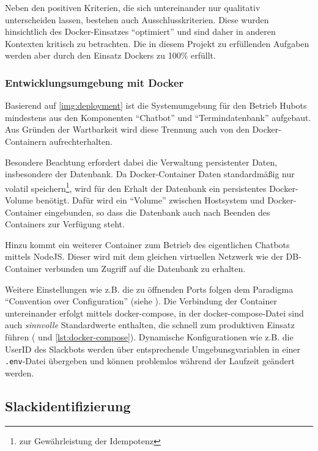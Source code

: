 Neben den positiven Kriterien, die sich untereinander nur qualitativ unterscheiden lassen, bestehen auch Ausschlusskriterien. Diese wurden hinsichtlich des Docker-Einsatzes \enquote{optimiert} und sind daher in anderen Kontexten kritisch zu betrachten. Die in diesem Projekt zu erfüllenden Aufgaben werden aber durch den Einsatz Dockers zu 100\% erfüllt.

\subsubsection{Entwicklungsumgebung mit Docker}

Basierend auf \autoref{img:deployment} ist die Systemumgebung für den Betrieb Hubots mindestens aus den Komponenten \enquote{Chatbot} und \enquote{Termindatenbank} aufgebaut. Aus Gründen der Wartbarkeit wird diese Trennung auch von den Docker-Containern aufrechterhalten.

Besondere Beachtung erfordert dabei die Verwaltung persistenter Daten, insbesondere der Datenbank. Da Docker-Container Daten standardmäßig nur volatil speichern\footnote{zur Gewährleistung der Idempotenz}, wird für den Erhalt der Datenbank ein persistentes Docker-Volume benötigt. Dafür wird ein \enquote{Volume} zwischen Hostsystem und Docker-Container eingebunden, so dass die Datenbank auch nach Beenden des Containers zur Verfügung steht.

Hinzu kommt ein weiterer Container zum Betrieb des eigentlichen Chatbots mittels NodeJS. Dieser wird mit dem gleichen virtuellen Netzwerk wie der DB-Container verbunden um Zugriff auf die Datenbank zu erhalten.

Weitere Einstellungen wie z.B. die zu öffnenden Ports folgen dem Paradigma \enquote{Convention over Configuration} (siehe \cite{NicholasChenConventionConfiguration2006}). Die Verbindung der Container untereinander erfolgt mittels docker-compose, in der docker-compose-Datei sind auch \textit{sinnvolle} Standardwerte enthalten, die schnell zum produktiven Einsatz führen (\cite{DockerInc.DockerCompose2018} und \autoref{lst:docker-compose}).
Dynamische Konfigurationen wie z.B. die UserID des Slackbots werden über entsprechende Umgebunsgvariablen in einer \verb+.env+-Datei übergeben und können problemlos während der Laufzeit geändert werden.





\subsection{Slackidentifizierung}

